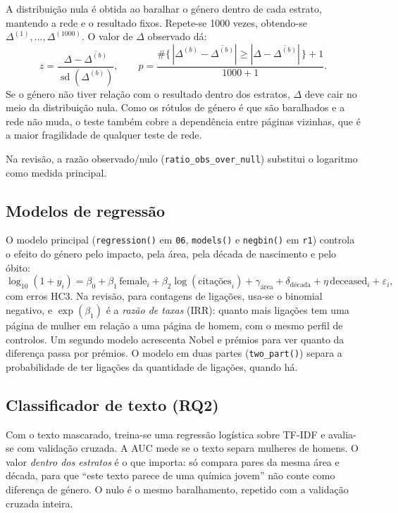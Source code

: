 \documentclass[11pt,a4paper]{article}
\newcommand{\file}[1]{\texttt{#1}}
\newcommand{\fn}[1]{\texttt{#1()}}
\begin{document}
A distribuição nula é obtida ao baralhar o género dentro de cada estrato, mantendo a rede e o resultado fixos. Repete-se 1000 vezes, obtendo-se $\Delta^{(1)}, \dots, \Delta^{(1000)}$. O valor de $\Delta$ observado dá:
\[
  z = \frac{\Delta - \overline{\Delta^{(b)}}}{\operatorname{sd}(\Delta^{(b)})}, \qquad
  p = \frac{\#\{\,|\Delta^{(b)} - \overline{\Delta^{(b)}}| \ge |\Delta - \overline{\Delta^{(b)}}|\,\} + 1}{1000 + 1}.
\]
Se o género não tiver relação com o resultado dentro dos estratos, $\Delta$ deve cair no meio da distribuição nula. Como os rótulos de género é que são baralhados e a rede não muda, o teste também cobre a dependência entre páginas vizinhas, que é a maior fragilidade de qualquer teste de rede.

Na revisão, a razão observado/nulo (\texttt{ratio\_obs\_over\_null}) substitui o logaritmo como medida principal.

\subsection{Modelos de regressão}

O modelo principal (\fn{regression} em \file{06}, \fn{models} e \fn{negbin} em \file{r1}) controla o efeito do género pelo impacto, pela área, pela década de nascimento e pelo óbito:
\[
  \log_{10}(1+y_i) = \beta_0 + \beta_1\,\text{female}_i + \beta_2 \log(\text{citações}_i) + \gamma_{\text{área}} + \delta_{\text{década}} + \eta\,\text{deceased}_i + \varepsilon_i,
\]
com erros HC3. Na revisão, para contagens de ligações, usa-se o binomial negativo, e $\exp(\beta_1)$ é a \emph{razão de taxas} (IRR): quanto mais ligações tem uma página de mulher em relação a uma página de homem, com o mesmo perfil de controlos. Um segundo modelo acrescenta Nobel e prémios para ver quanto da diferença passa por prémios. O modelo em duas partes (\fn{two_part}) separa a probabilidade de ter ligações da quantidade de ligações, quando há.

\subsection{Classificador de texto (RQ2)}

Com o texto mascarado, treina-se uma regressão logística sobre TF-IDF e avalia-se com validação cruzada. A AUC mede se o texto separa mulheres de homens. O valor \emph{dentro dos estratos} é o que importa: só compara pares da mesma área e década, para que ``este texto parece de uma química jovem'' não conte como diferença de género. O nulo é o mesmo baralhamento, repetido com a validação cruzada inteira.
\end{document}

